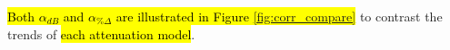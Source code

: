 \documentclass[12pt]{report}
\begin{document}

\hl{Both $\alpha_{dB}$ and $\alpha_{\%\Delta}$ are illustrated in Figure \ref{fig:corr_compare}} to contrast the trends of \hl{each attenuation model}.
\end{document}
